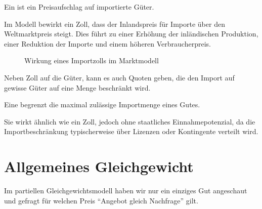 \begin{definition}
    Ein  ist ein Preisaufschlag auf importierte Güter. 
\end{definition}
Im Modell bewirkt ein Zoll, dass der Inlandspreis für Importe über den Weltmarktpreis steigt. Dies führt zu einer Erhöhung der inländischen Produktion, einer Reduktion der Importe und einem höheren Verbraucherpreis.

\begin{figure}[h!]
\centering
{}
\caption{Wirkung eines Importzolls im Marktmodell}
\end{figure}


Neben Zoll auf die Güter, kann es auch Quoten geben, die den Import auf gewisse Güter auf eine Menge beschränkt wird.
\begin{definition}
    Eine  begrenzt die maximal zulässige Importmenge eines Gutes. 
\end{definition}
 Sie wirkt ähnlich wie ein Zoll, jedoch ohne staatliches Einnahmepotenzial, da die Importbeschränkung typischerweise über Lizenzen oder Kontingente verteilt wird.



\section{Allgemeines Gleichgewicht}
Im partiellen Gleichgewichtsmodell haben wir nur ein einziges Gut
angeschaut und gefragt für welchen Preis \enquote{Angebot gleich Nachfrage} gilt.

